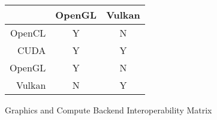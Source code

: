 \begin{figure}[ht]
    \centering
    \begin{tabular}{r|c c}
        & OpenGL & Vulkan \\
        \hline
        OpenCL & Y & N \\ 
        CUDA & Y & Y \\ 
        OpenGL & Y & N \\ 
        Vulkan & N & Y \\ 
    \end{tabular}
    \caption{Graphics and Compute Backend Interoperability Matrix}
    \label{fig:LibraryChoices}
\end{figure}